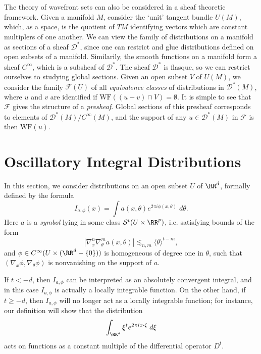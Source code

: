 The theory of wavefront sets can also be considered in a sheaf theoretic framework. Given a manifold $M$, consider the `unit' tangent bundle $U(M)$, which, as a space, is the quotient of $TM$ identifying vectors which are constant multiplers of one another. We can view the family of distributions on a manifold as sections of a sheaf $\mathcal{D}^*$, since one can restrict and glue distributions defined on open subsets of a manifold. Similarily, the smooth functions on a manifold form a sheaf $C^\infty$, which is a subsheaf of $\mathcal{D}^*$. The sheaf $\mathcal{D}^*$ is flasque, so we can restrict ourselves to studying global sections. Given an open subset $V$ of $U(M)$, we consider the family $\mathcal{F}(U)$ of all \emph{equivalence classes} of distributions in $\mathcal{D}^*(M)$, where $u$ and $v$ are identified if $\text{WF}((u - v) \cap V) = \emptyset$. It is simple to see that $\mathcal{F}$ gives the structure of a \emph{presheaf}. Global sections of this presheaf corresponds to elements of $\mathcal{D}^*(M) / C^\infty(M)$, and the support of any $u \in \mathcal{D}^*(M)$ in $\mathcal{F}$ is then $\text{WF}(u)$.

\section{Oscillatory Integral Distributions}

In this section, we consider distributions on an open subset $U$ of $\RR^d$, formally defined by the formula
%
\[ I_{a,\phi}(x) = \int a(x,\theta) e^{2 \pi i \phi(x,\theta)}\; d\theta. \]
%
Here $a$ is a \emph{symbol} lying in some class $\mathcal{S}^t(U \times \RR^p)$, i.e. satisfying bounds of the form
%
\[ |\nabla_x^n \nabla_\theta^m a(x,\theta)| \lesssim_{n,m} \langle \theta \rangle^{t - m}, \]
%
and $\phi \in C^\infty(U \times (\RR^d - \{ 0 \}))$ is homogeneous of degree one in $\theta$, such that $(\nabla_x \phi, \nabla_\theta \phi)$ is nonvanishing on the support of $a$.

If $t < -d$, then $I_{a,\phi}$ can be interpreted as an absolutely convergent integral, and in this case $I_{a,\phi}$ is actually a locally integrable function. On the other hand, if $t \geq -d$, then $I_{a,\phi}$ will no longer act as a locally integrable function; for instance, our definition will show that the distribution
%
\[ \int_{\RR^d} \xi^t e^{2 \pi i x \cdot \xi}\; d\xi \]
%
acts on functions as a constant multiple of the differential operator $D^t$.

